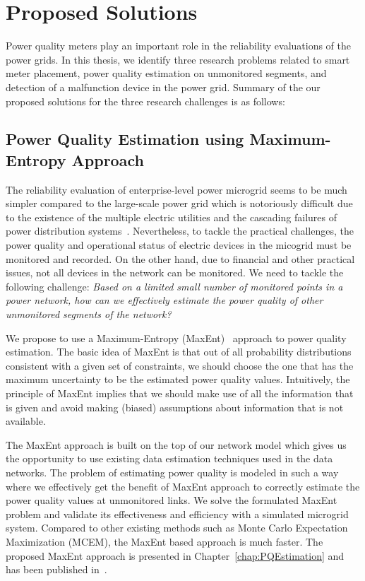 \section{Proposed Solutions}
Power quality meters play an important role in the reliability evaluations of the power grids. In this thesis, we identify three research problems related to smart meter placement, power quality estimation on unmonitored segments, and detection of a malfunction device in the power grid. Summary of the our proposed solutions for the three research challenges is as follows:

\subsection{Power Quality Estimation using Maximum-Entropy Approach}
The reliability evaluation of enterprise-level power microgrid seems to be much simpler compared to the large-scale power grid which is notoriously difficult due to the existence of the multiple electric utilities and the cascading failures of power distribution systems~\cite{Albert04}. Nevertheless, to tackle the practical challenges, the power quality and operational status of electric devices in the micogrid must be monitored and recorded. On the other hand, due to financial and other practical issues, not all devices in the network can be monitored. We need to tackle the following challenge: \textit{Based on a limited small number of monitored points in a power network, how can we effectively estimate the power quality of other unmonitored segments of the network?}

We propose to use a Maximum-Entropy (MaxEnt)~\cite{maxent} approach to power quality estimation. The basic idea of MaxEnt is that out of all probability distributions consistent with a given set of constraints, we should choose the one that has the maximum uncertainty to be the estimated power quality values. Intuitively, the principle of MaxEnt implies that we should make use of all the information that is given and avoid making (biased) assumptions about information that is not available.

The MaxEnt approach is built on the top of our network model which gives us the opportunity to use existing data estimation techniques used in the data networks. The problem of estimating power quality is modeled in such a way where we effectively get the benefit of MaxEnt approach to correctly estimate the power quality values at unmonitored links. We solve the formulated MaxEnt problem and validate its effectiveness and efficiency with a simulated microgrid system. Compared to other existing methods such as Monte Carlo Expectation Maximization (MCEM), the MaxEnt based approach is much faster. The proposed MaxEnt approach is presented in Chapter~\ref{chap:PQEstimation} and has been published in~\cite{ali2013maximum}.

